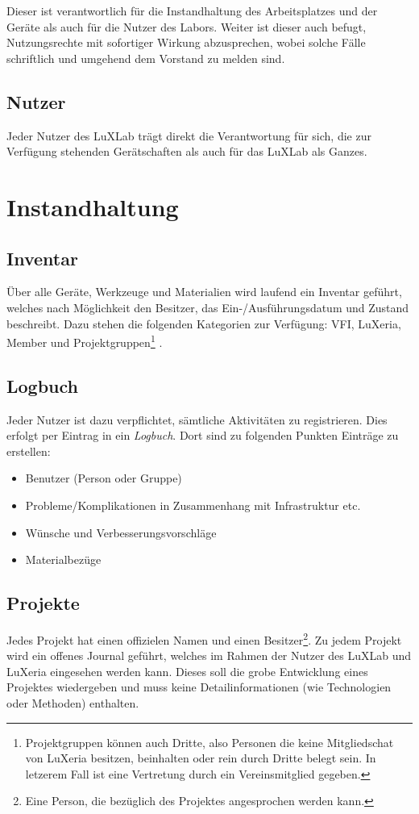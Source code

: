 \documentclass[a4paper,
               10pt,
               fleqn]{article}
\begin{document}
Dieser ist verantwortlich für die Instandhaltung des Arbeitsplatzes und der 
Geräte als auch für die Nutzer des Labors. Weiter ist dieser auch befugt, 
Nutzungsrechte mit sofortiger Wirkung abzusprechen, wobei solche
Fälle schriftlich und umgehend dem Vorstand zu melden sind.

\subsection{Nutzer}
Jeder Nutzer des LuXLab trägt direkt die Verantwortung für sich,
die zur Verfügung stehenden Gerätschaften als auch für das LuXLab als Ganzes.

\section{Instandhaltung}

\subsection{Inventar}
Über alle Geräte, Werkzeuge und Materialien wird laufend ein Inventar 
geführt, welches nach Möglichkeit den Besitzer, das Ein-/Ausführungsdatum 
und Zustand beschreibt. 
Dazu stehen die folgenden Kategorien zur Verfügung: VFI, LuXeria, Member und
Projektgruppen\footnote{
    Projektgruppen können auch Dritte, also Personen die keine Mitgliedschat
    von LuXeria besitzen, beinhalten oder rein durch Dritte belegt sein. 
    In letzerem Fall ist eine Vertretung durch ein Vereinsmitglied gegeben.}
.

\subsection{Logbuch}
Jeder Nutzer ist dazu verpflichtet, sämtliche Aktivitäten zu registrieren.
Dies erfolgt per Eintrag in ein \emph{Logbuch}. Dort sind zu folgenden
Punkten Einträge zu erstellen:
\begin{itemize}
    \item Benutzer (Person oder Gruppe)
    \item Probleme/Komplikationen in Zusammenhang mit Infrastruktur etc.
    \item Wünsche und Verbesserungsvorschläge
    \item Materialbezüge
\end{itemize}

\subsection{Projekte}
Jedes Projekt hat einen offizielen Namen und einen Besitzer\footnote{
    Eine Person, die bezüglich des Projektes angesprochen werden kann.}.
Zu jedem Projekt wird ein offenes Journal geführt, welches im Rahmen der
Nutzer des LuXLab und LuXeria eingesehen werden kann. 
Dieses soll die grobe Entwicklung
eines Projektes wiedergeben und muss keine Detailinformationen 
(wie Technologien oder Methoden) enthalten. 
\end{document}
